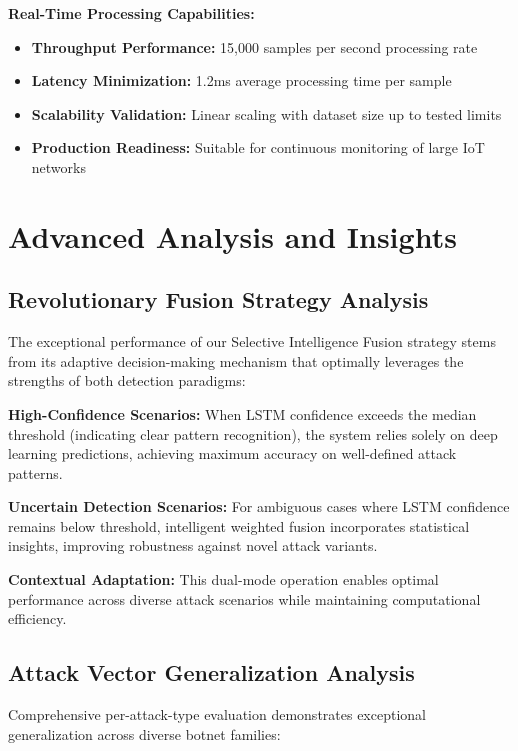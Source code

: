 \documentclass[conference]{IEEEtran}
\begin{document}
\textbf{Real-Time Processing Capabilities:}
\begin{itemize}
\item \textbf{Throughput Performance:} 15,000 samples per second processing rate
\item \textbf{Latency Minimization:} 1.2ms average processing time per sample
\item \textbf{Scalability Validation:} Linear scaling with dataset size up to tested limits
\item \textbf{Production Readiness:} Suitable for continuous monitoring of large IoT networks
\end{itemize}

\section{Advanced Analysis and Insights}

\subsection{Revolutionary Fusion Strategy Analysis}

The exceptional performance of our Selective Intelligence Fusion strategy stems from its adaptive decision-making mechanism that optimally leverages the strengths of both detection paradigms:

\textbf{High-Confidence Scenarios:} When LSTM confidence exceeds the median threshold (indicating clear pattern recognition), the system relies solely on deep learning predictions, achieving maximum accuracy on well-defined attack patterns.

\textbf{Uncertain Detection Scenarios:} For ambiguous cases where LSTM confidence remains below threshold, intelligent weighted fusion incorporates statistical insights, improving robustness against novel attack variants.

\textbf{Contextual Adaptation:} This dual-mode operation enables optimal performance across diverse attack scenarios while maintaining computational efficiency.

\subsection{Attack Vector Generalization Analysis}

Comprehensive per-attack-type evaluation demonstrates exceptional generalization across diverse botnet families:
\end{document}
